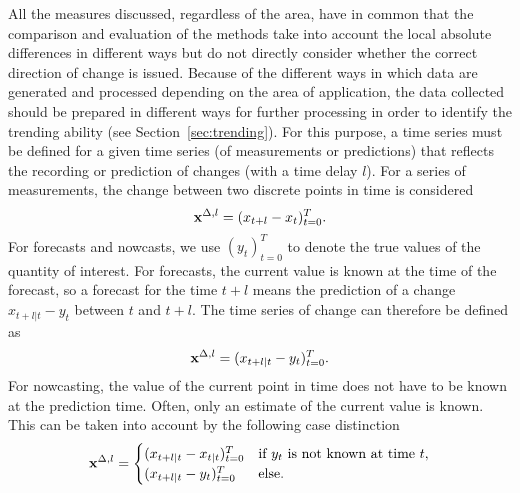 All the measures discussed, regardless of the area, have in common that the comparison and evaluation of the methods take into account the local absolute differences in different ways but do not directly consider whether the correct direction of change is issued.
Because of the different ways in which data are generated and processed depending on the area of application, the data collected should be prepared in different ways for further processing in order to identify the trending ability (see Section~\ref{sec:trending}). For this purpose, a time series must be defined for a given time series (of measurements or predictions) that reflects the recording or prediction of changes (with a time delay $l$). For a series of measurements, the change between two discrete points in time is considered
\begin{equation}
    \mathbf{x}^{\Delta,l} = (x_{t+l} -x_{t})^T_{t=0}. \label{eq:diffxl_measure}
\end{equation}
For forecasts and nowcasts, we use $(y_t)^T_{t=0}$ to denote the true values of the quantity of interest. For forecasts, the current value is known at the time of the forecast, so a forecast for the time $t+l$ means the prediction of a change $x_{t+l|t} -y_{t}$ between $t$ and $t+l$. The time series of change can therefore be defined as 
\begin{equation}
    \mathbf{x}^{\Delta,l} = (x_{t+l|t} -y_{t})^T_{t=0}.\label{eq:diffxl_forecasting}
\end{equation}
For nowcasting, the value of the current point in time does not have to be known at the prediction time. Often, only an estimate of the current value is known. This can be taken into account by the following case distinction
\begin{equation}
\mathbf{x}^{\Delta,l} = 
\begin{cases} 
(x_{t+l|t} -x_{t|t})^T_{t=0} & \text{if } y_{t} \text{ is not known at time } t, \\
(x_{t+l|t} -y_{t})^T_{t=0}  & \text{else}.
\end{cases} \label{eq:diffxl_nowcasting}
\end{equation}







